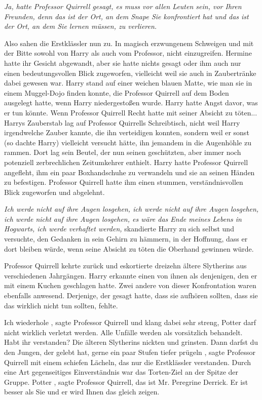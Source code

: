 \emph{ Ja, hatte Professor Quirrell gesagt, es muss vor allen Leuten sein, vor
Ihren Freunden, denn das ist der Ort, an dem Snape Sie konfrontiert hat und das
ist der Ort, an dem Sie lernen müssen, zu verlieren.}

Also sahen die Erstklässler nun zu. In magisch erzwungenem Schweigen und mit der
Bitte sowohl von Harry als auch vom Professor, nicht einzugreifen. Hermine hatte
ihr Gesicht abgewandt, aber sie hatte nichts gesagt oder ihm auch nur einen
bedeutungsvollen Blick zugeworfen, vielleicht weil sie auch in Zaubertränke
dabei gewesen war. Harry stand auf einer weichen blauen Matte, wie man sie in
einem Muggel-Dojo finden konnte, die Professor Quirrell auf dem Boden ausgelegt
hatte, wenn Harry niedergestoßen wurde. Harry hatte Angst davor, was er tun
könnte. Wenn Professor Quirrell Recht hatte mit seiner Absicht zu töten...
Harrys Zauberstab lag auf Professor Quirrells Schreibtisch, nicht weil Harry
irgendwelche Zauber kannte, die ihn verteidigen konnten, sondern weil er sonst
(so dachte Harry) vielleicht versucht hätte, ihn jemandem in die Augenhöhle zu
rammen. Dort lag sein Beutel, der nun seinen geschützten, aber immer noch
potenziell zerbrechlichen Zeitumkehrer enthielt. Harry hatte Professor Quirrell
angefleht, ihm ein paar Boxhandschuhe zu verwandeln und sie an seinen Händen zu
befestigen. Professor Quirrell hatte ihm einen stummen, verständnisvollen Blick
zugeworfen und abgelehnt.

\emph{Ich werde nicht auf ihre Augen losgehen, ich werde nicht auf ihre Augen
losgehen, ich werde nicht auf ihre Augen losgehen, es wäre das Ende meines
Lebens in Hogwarts, ich werde verhaftet werden,} skandierte Harry zu sich selbst
und versuchte, den Gedanken in sein Gehirn zu hämmern, in der Hoffnung, dass er
dort bleiben würde, wenn seine Absicht zu töten die Oberhand gewinnen würde.

Professor Quirrell kehrte zurück und eskortierte dreizehn ältere Slytherins aus
verschiedenen Jahrgängen. Harry erkannte einen von ihnen als denjenigen, den er
mit einem Kuchen geschlagen hatte. Zwei andere von dieser Konfrontation waren
ebenfalls anwesend. Derjenige, der gesagt hatte, dass sie aufhören sollten, dass
sie das wirklich nicht tun sollten, fehlte.

\glqq Ich wiederhole\grqq{} , sagte Professor Quirrell und klang dabei sehr
streng, \glqq Potter darf nicht wirklich verletzt werden. Alle Unfälle werden
als vorsätzlich behandelt. Habt ihr verstanden?\grqq{} Die älteren Slytherins
nickten und grinsten. \glqq Dann darfst du den Jungen, der gelebt hat, gerne ein
paar Stufen tiefer prügeln\grqq{} , sagte Professor Quirrell mit einem schiefen
Lächeln, das nur die Erstklässler verstanden. Durch eine Art gegenseitiges
Einverständnis war das Torten-Ziel an der Spitze der Gruppe. \glqq Potter\grqq{}
, sagte Professor Quirrell, \glqq das ist Mr. Peregrine Derrick. Er ist besser
als Sie und er wird Ihnen das gleich zeigen.\grqq{}

